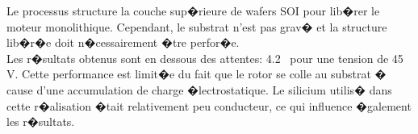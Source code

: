 Le processus structure la couche sup�rieure de wafers SOI pour lib�rer le moteur monolithique. Cependant, le substrat n'est pas grav� et la structure lib�r�e doit n�cessairement �tre perfor�e.\\
Les r�sultats obtenus sont en dessous des attentes: 4.2 \degre \ pour une tension de 45 V. Cette performance est limit�e du fait que le rotor se colle au substrat � cause d'une accumulation de charge �lectrostatique. Le silicium utilis� dans cette r�alisation �tait relativement peu conducteur, ce qui influence �galement les r�sultats.







